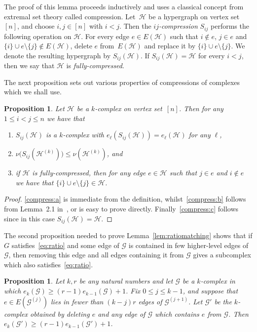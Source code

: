 \documentclass[12pt,a4paper]{amsart}
\def\itm#1{\rm ({#1})}
\def\itmit#1{\itm{\it #1\,}}
\def\abc{\itmit{\alph{*}}}
\newtheorem{proposition}[theorem] {Proposition}
\newcommand{\Hy}{\mathcal{H}}
\newcommand{\cG}{\mathcal{G}}
\begin{document}
The proof of this lemma proceeds inductively and uses a classical
concept from extremal set theory called compression.  Let~$\Hy$ be a hypergraph on vertex set $[n]$, and choose $i, j \in [n]$ with $i < j$.  Then the \emph{$ij$-compression}
$S_{ij}$ performs the following operation on $\Hy$. For every edge $e \in E(\Hy)$ such 
that $i \notin e$, $j \in e$ and $\{i\} \cup e \setminus \{j\} \notin E(\Hy)$, delete $e$ from~$E(\Hy)$ 
and replace it by $\{i\} \cup e \setminus \{j\}$. We denote the resulting
hypergraph by $S_{ij}(\Hy)$.  If $S_{ij}(\Hy) = \Hy$ for every $i < j$, then we say that $\Hy$ is \emph{fully-compressed}.

The next proposition sets out various properties of compressions of complexes which we shall use.
\begin{proposition}\label{compress}
Let $\Hy$ be a $k$-complex on vertex set~$[n]$. Then for any $1 \leq i < j \leq n$ we have that
\begin{enumerate}[label=\abc]
 \item\label{compress:a} $S_{ij}(\Hy)$ is a $k$-complex with $e_\ell(S_{ij}(\Hy)) = e_\ell(\Hy)$ for any $\ell$, 
 \item\label{compress:b} $\nu\big(S_{ij}(\Hy^{(k)})\big)\leq \nu(\Hy^{(k)})$, and
 \item\label{compress:c} if $\Hy$ is fully-compressed, then for any edge $e \in \Hy$ such that $j \in e$ and $i \notin e$ we have that $\{i\} \cup e \setminus \{j\} \in \Hy$.
\end{enumerate}
\end{proposition}
\begin{proof}
\ref{compress:a} is immediate from the definition, whilst~\ref{compress:b} follows from Lemma~2.1 in~\cite{HuangLohSud}, or is easy to prove directly. Finally~\ref{compress:c} follows since in this case $S_{ij}(\Hy)=\Hy$.
\end{proof}

The second proposition needed to prove Lemma~\ref{lem:ratiomatching} shows that if $G$ satisfies~\eqref{eq:ratio} and some edge of $\cG$ is contained in few higher-level edges of $\cG$, then removing this edge and all edges containing it from $\cG$ gives a subcomplex which also satisfies~\eqref{eq:ratio}.

  \begin{proposition}\label{deletelowdeg}
Let $k,r$ be any natural numbers and let
$\cG$ be a $k$-complex in which $e_k(\cG)\geq (r-1)e_{k-1}(\cG)+1$.
Fix $0 \leq j \leq k-1$, and suppose that 
$e \in E(\cG^{(j)})$ lies in fewer than $(k-j)r$ edges
of $\cG^{(j+1)}$. Let $\cG'$ be the $k$-complex obtained by
deleting $e$ and any edge of $\cG$ which contains $e$ from $\cG$. 
Then $e_k(\cG')\geq (r-1)e_{k-1}(\cG')+1$.
  \end{proposition}
  
\end{document}
